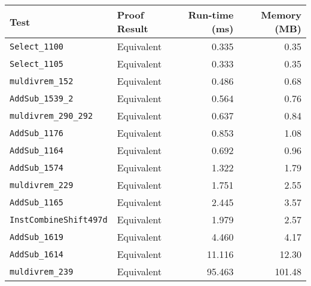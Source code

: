 \begin{tabular}{llrr}
\toprule
\textbf{Test} & \textbf{Proof Result} & \textbf{Run-time (ms)} & \textbf{Memory (MB)} \\
\midrule
\texttt{Select\_1100} & Equivalent & 0.335 & 0.35 \\
\texttt{Select\_1105} & Equivalent & 0.333 & 0.35 \\
\texttt{muldivrem\_152} & Equivalent & 0.486 & 0.68 \\
\texttt{AddSub\_1539\_2} & Equivalent & 0.564 & 0.76 \\
\texttt{muldivrem\_290\_292} & Equivalent & 0.637 & 0.84 \\
\texttt{AddSub\_1176} & Equivalent & 0.853 & 1.08 \\
\texttt{AddSub\_1164} & Equivalent & 0.692 & 0.96 \\
\texttt{AddSub\_1574} & Equivalent & 1.322 & 1.79 \\
\texttt{muldivrem\_229} & Equivalent & 1.751 & 2.55 \\
\texttt{AddSub\_1165} & Equivalent & 2.445 & 3.57 \\
\texttt{InstCombineShift497d} & Equivalent & 1.979 & 2.57 \\
\texttt{AddSub\_1619} & Equivalent & 4.460 & 4.17 \\
\texttt{AddSub\_1614} & Equivalent & 11.116 & 12.30 \\
\texttt{muldivrem\_239} & Equivalent & 95.463 & 101.48 \\
\bottomrule
\end{tabular}
